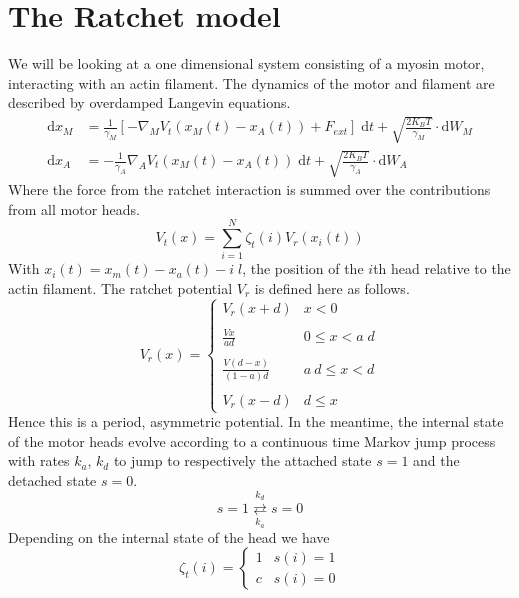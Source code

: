 \documentclass[aps,pre,onecolumn,showpacs,showkeys,a4paper]{revtex4}
\newcommand{\rmd}{{\mathrm d}}
\begin{document}
\section{The Ratchet model}
We will be looking at a one dimensional system consisting of a myosin motor, interacting with an actin filament. The dynamics of the motor and filament are described by overdamped Langevin equations. 
\begin{align}
\rmd x_M &= \frac{1}{\gamma_M} \left[ - \nabla_M V_t(x_M(t) - x_A(t)) + F_{ext} \right] \; \rmd t + \sqrt{ \frac{2 K_B T}{\gamma_M} } \cdot \rmd W_M \label{eom_M}\\
\rmd x_A &= - \frac{1}{\gamma_A} \nabla_A V_t(x_M(t) - x_A(t)) \; \rmd t + \sqrt{ \frac{2 K_B T}{\gamma_A} } \cdot \rmd W_A
\label{eom_A}
\end{align}
Where the force from the ratchet interaction is summed over the contributions from all motor heads.
\begin{equation}
V_t(x) = \sum_{i=1}^{N} \zeta_t(i) V_{r} (x_i(t))
\end{equation}
With $x_i(t) = x_{m}(t)-x_{a}(t) - i\;l$, the position of the $i$th head relative to the actin filament.
The ratchet potential $V_r$ is defined here as follows.
\begin{equation}
V_{r}(x) =  \begin{cases}
	V_r(x+d) & x < 0\\ 
	\\
      \displaystyle \frac{Vx}{ad} & 0 \leq x < a\;d \\
      \\
      \displaystyle \frac{V(d-x)}{(1-a)d} & a\ d \leq x < d\\
    \\
    V_r(x-d) & d \leq x  
   \end{cases}
   \label{rat_pot}
\end{equation}
Hence this is a period, asymmetric potential.
In the meantime, the internal state of the motor heads evolve according to a continuous time Markov jump process with rates $k_a$, $k_d$ to jump to respectively the attached state $s=1$ and the detached state $s=0$.
\begin{equation}
s = 1 \overset{k_d}{\underset{k_a}{\rightleftarrows}} s = 0
\end{equation}
Depending on the internal state of the head we have 
\begin{equation}
\zeta_t(i) =  \begin{cases} 
      1 & s(i) = 1\\
      c & s(i) = 0
   \end{cases}
\end{equation}
\end{document}
